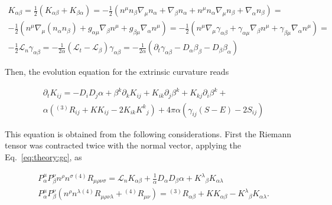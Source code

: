 \begin{equation}
    \begin{aligned}
    K_{\alpha\beta} = \frac{1}{2}(K_{\alpha\beta} + K_{\beta\alpha}) = -\frac{1}{2}(n^{\mu}n_{\beta}\nabla_{\mu}n_{\alpha} + \nabla_{\beta}n_{\alpha}+n^{\mu}n_{\alpha}\nabla_{\mu}n_{\beta}+\nabla_{\alpha}n_{\beta}) = \\
    -\frac{1}{2}(n^{\mu}\nabla_{\mu}(n_{\alpha}n_{\beta}) +g_{\alpha\mu}\nabla_{\beta}n^{\mu} + g_{\beta\mu}\nabla_{\alpha}n^{\mu}) = -\frac{1}{2}(n^{\mu}\nabla_{\mu}\gamma_{\alpha\beta} + \gamma_{\alpha\mu} \nabla_{\beta} n^{\mu} + \gamma_{\beta\mu}\nabla_{\alpha}n^{\mu}) = \\
    -\frac{1}{2}\mathcal{L}_{n}\gamma_{\alpha\beta} = -\frac{1}{2\alpha}(\mathcal{L}_t - \mathcal{L}_{\beta})\gamma_{\alpha\beta} = -\frac{1}{2\alpha}(\partial_t\gamma_{\alpha\beta} - D_{\alpha}\beta_{\beta} - D_{\beta}\beta_{\alpha})
    \end{aligned}
\end{equation}

Then, the evolution equation for the extrinsic curvature reads 

\begin{equation}
    \begin{aligned}
    \partial_t K_{ij} = -D_i D_j \alpha + \beta^k \partial_k K_{ij} + K_{ik}\partial_j \beta^k + K_{kj}\partial_i \beta^k + \\
    \alpha({^{(3)}R_{ij}} + KK_{ij} - 2K_{ik}{K^k}_j) + 4\pi \alpha (\gamma_{ij}(S-E) - 2S_{ij})
    \end{aligned}
    \label{eq:theory:evol_eq}
\end{equation}

This equation is obtained from the following considerations. 
First the Riemann tensor was contracted twice with the normal vector, applying the 
Eq.~\eqref{eq:theory:gc}, as 

\begin{equation}
    \begin{aligned}
    P_{\alpha}^{\mu}P_{\beta}^{\nu}n^{\rho}n^{\sigma}{^{(4)}R_{\mu\rho\nu\sigma}} = \mathcal{L}_{n} K_{\alpha\beta} + \frac{1}{\alpha} D_{\alpha}D_{\beta}\alpha + {K^{\lambda}}_{\beta}K_{\alpha\lambda} \label{eq:theory:for_ev1}\\
    P_{\alpha}^{\mu}P_{\beta}^{\nu}(n^{\rho}n^{\lambda} {^{(4)}R_{\mu\rho\nu\lambda}} + {^{(4)}R_{\mu\nu}}) = 
    {^{(3)}R_{\alpha\beta}} + KK_{\alpha\beta} - {K^{\lambda}}_{\beta}K_{\alpha\lambda}. \label{eq:theory:for_ev2}
    \end{aligned}
\end{equation}

